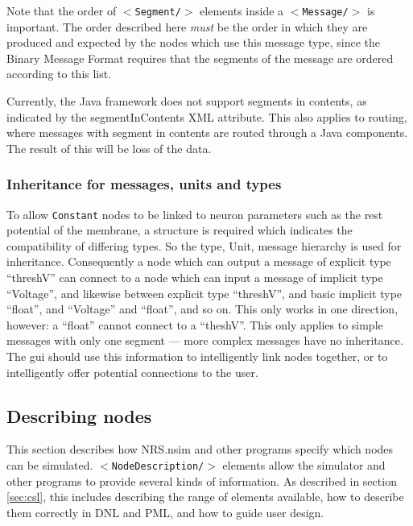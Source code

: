 \documentclass[pdftex,a4paper]{article}
\newcommand{\XML}[2][]{{\tt \small $<$#2#1/$>$}}
\newcommand{\XMLfont}[1]{{\tt \small #1}}
\begin{document}
Note that the order of \XML{Segment} elements inside a \XML{Message}
is important. The order described here {\em must} be the order in
which they are produced and expected by the nodes which use this
message type, since the Binary Message Format requires that the
segments of the message are ordered according to this list.

Currently, the Java framework does not support segments in contents, as
indicated by the segmentInContents XML attribute. This also applies to routing,
where messages with segment in contents are routed through a Java
components. The result of this will be loss of the data.

\subsubsection{Inheritance for messages, units and types}

To allow \XMLfont{Constant} nodes to be linked to neuron parameters
such as the rest potential of the membrane, a structure is required
which indicates the compatibility of differing types. So the type,
Unit, message hierarchy is used for inheritance. Consequently a node
which can output a message of explicit type ``threshV'' can connect to
a node which can input a message of implicit type ``Voltage'', and
likewise between explicit type ``threshV'', and basic implicit type
``float'', and ``Voltage'' and ``float'', and so on. This only works
in one direction, however: a ``float'' cannot connect to a
``theshV''. This only applies to simple messages with only one segment
--- more complex messages have no inheritance. The gui should use this
information to intelligently link nodes together, or to intelligently
offer potential connections to the user.

\subsection{Describing nodes}

This section describes how NRS.nsim and other programs specify which
nodes can be simulated. \XML{NodeDescription} elements allow the
simulator and other programs to provide several kinds of information. As
described in section \ref{sec:csl}, this includes describing the range
of elements available, how to describe them correctly in DNL and PML,
and how to guide user design.
\end{document}
